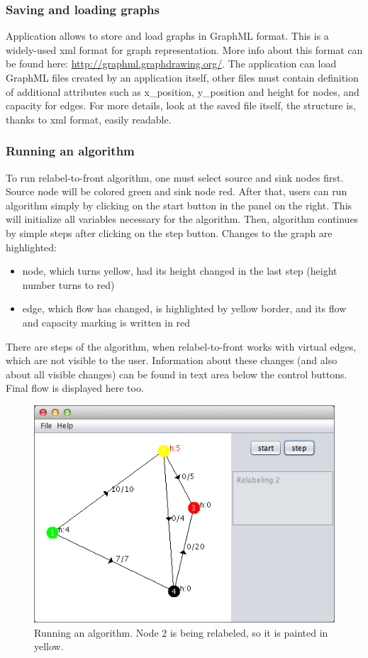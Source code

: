 \documentclass[a4paper,11pt]{article}
\begin{document}
\subsubsection*{Saving and loading graphs}
Application allows to store and load graphs in GraphML format. This is a widely-used 
xml format for graph representation. More info about this format can be found here: 
\url{http://graphml.graphdrawing.org/}. The application can load GraphML files created
by an application itself, other files must contain definition of additional attributes
such as x\_position, y\_position and height for nodes, and capacity for edges. For more
details, look at the saved file itself, the structure is, thanks to xml format, 
easily readable. 

\subsubsection*{Running an algorithm}
To run relabel-to-front algorithm, one must select source and sink nodes first. 
Source node will be colored green and sink node red. After that, users can run 
algorithm simply by clicking on the start button in the panel on the right. 
This will initialize all variables necessary for the algorithm. Then, algorithm 
continues by simple steps after clicking on the step button. Changes to the 
graph are highlighted:
\begin{itemize}
\item node, which turns yellow, had its height changed in the last step (height 
number turns to red)
\item edge, which flow has changed, is highlighted by yellow border, and its 
flow and capacity marking is written in red
\end{itemize}

There are steps of the algorithm, when relabel-to-front works with virtual edges,
which are not visible to the user. Information about these changes (and also 
about all visible changes) can be found in text area below the control buttons.
Final flow is displayed here too.

\begin{figure}[H]
\centering
\includegraphics[width=12cm]{2.png}
\caption{Running an algorithm. Node 2 is being relabeled, so it is painted in yellow.}
\label{pic1}
\end{figure}
\end{document}

